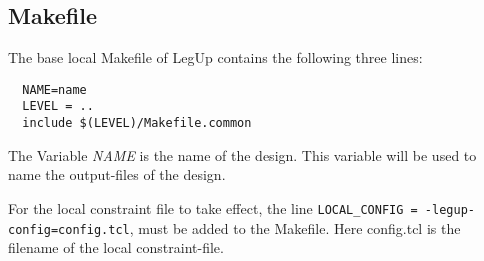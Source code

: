 \subsection{Makefile}
The base local Makefile of LegUp contains the following three lines:
\begin{verbatim}
  NAME=name
  LEVEL = ..
  include $(LEVEL)/Makefile.common
\end{verbatim}
The Variable \textit{NAME} is the name of the design. This variable will be used to name the output-files of the design.

For the local constraint file to take effect, the line \verb!LOCAL_CONFIG = -legup-config=config.tcl!, must be added to the Makefile. Here config.tcl is the filename of the local constraint-file.